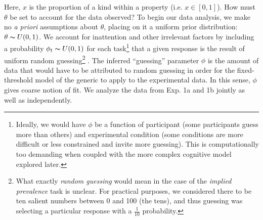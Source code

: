 \documentclass[10pt,letterpaper]{article}
\begin{document}



Here, $x$ is the proportion of a kind within a property (i.e. $x \in [0,1]$). How must $\theta$ be set to account for the data observed? 
To begin our data analysis, we make no \emph{a priori} assumptions about $\theta$, placing on it a uniform prior distribution: $\theta \thicksim U(0,1)$. 
We account for inattention and other irrelevant factors by including a probability $\phi_{t}\thicksim U(0,1)$ for each task\footnote{Ideally, we would have $\phi$ be a function of participant (some participants guess more than others) and experimental condition (some conditions are more difficult or less constrained and invite more guessing). This is computationally too demanding when coupled with the more complex cognitive model explored later.} that a given response is the result of uniform random guessing\footnote{What exactly \emph{random guessing} would mean in the case of the \emph{implied prevalence} task is unclear. For practical purposes, we considered there to be ten salient numbers between 0 and 100 (the tens), and thus guessing was selecting a particular response with a $\frac{1}{10}$ probability.} \cite{LW2014}.
The inferred ``guessing'' parameter $\phi$ is the amount of data that would have to be attributed to random guessing in order for the fixed-threshold model of the generic to apply to the experimental data. In this sense, $\phi$ gives coarse notion of fit. 
We analyze the data from Exp. 1a and 1b jointly as well as independently.


%
\end{document}
